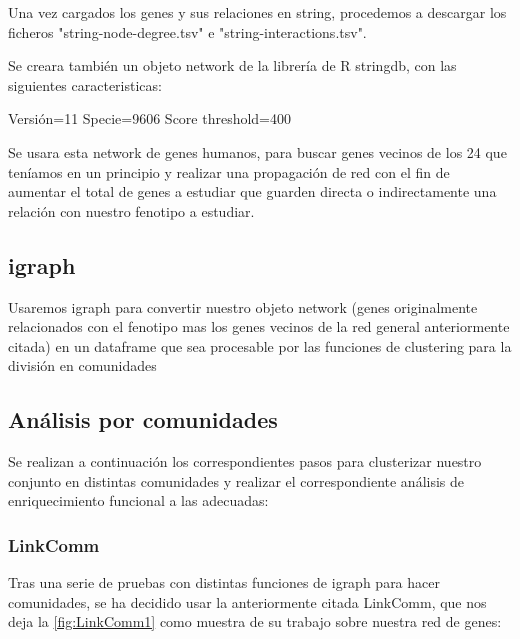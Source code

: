 Una vez cargados los genes y sus relaciones en string, procedemos a descargar los ficheros "string-node-degree.tsv" e "string-interactions.tsv".

Se creara también un objeto network de la librería de R stringdb, con las siguientes caracteristicas:

Versión=11
Specie=9606
Score threshold=400

\hfill

Se usara esta network de genes humanos, para buscar genes vecinos de los 24 que teníamos en un principio y realizar una propagación de red con el fin de aumentar el total de genes a estudiar que guarden directa o indirectamente una relación con nuestro fenotipo a estudiar.

\hfill

\subsection{igraph}

Usaremos igraph para convertir nuestro objeto network (genes originalmente relacionados con el  fenotipo mas los genes vecinos de la red general anteriormente citada) en un dataframe que sea procesable por las funciones de clustering para la división en comunidades

\hfill

\subsection{Análisis por comunidades}

Se realizan a continuación los correspondientes pasos para clusterizar nuestro conjunto en distintas comunidades y realizar el correspondiente análisis de enriquecimiento funcional a las adecuadas:

\subsubsection{LinkComm}

Tras una serie de pruebas con distintas funciones de igraph para hacer comunidades, se ha decidido usar la anteriormente citada LinkComm, que nos deja la \ref{fig:LinkComm1} como muestra de su trabajo sobre nuestra red de genes: 

